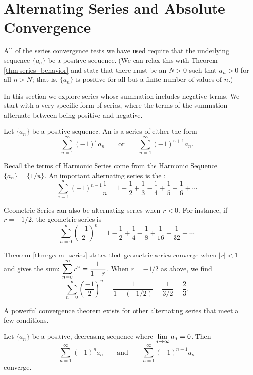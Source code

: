 \section{Alternating Series and Absolute Convergence}\label{sec:alt_series}

All of the series convergence tests we have used require that the underlying sequence $\{a_n\}$ be a positive sequence. (We can relax this with Theorem \ref{thm:series_behavior} and state that there must be an $N>0$ such that $a_n>0$ for all $n>N$; that is, $\{a_n\}$ is positive for all but a finite number of values of $n$.)

In this section we explore series whose summation includes negative terms. We start with a very specific form of series, where the terms of the summation alternate between being positive and negative.

{Let $\{a_n\}$ be a positive sequence. An  is a series of either the form
$$\sum_{n=1}^\infty (-1)^na_n\qquad \text{or}\qquad \sum_{n=1}^\infty (-1)^{n+1}a_n.$$
}

Recall the terms of Harmonic Series come from the Harmonic Sequence $\{a_n\} = \{1/n\}$. An important alternating series is the :
$$\sum_{n=1}^\infty (-1)^{n+1}\frac1n = 1-\frac12+\frac13-\frac14+\frac15-\frac16+\cdots$$

Geometric Series can also be alternating series when $r<0$. For instance, if $r=-1/2$, the geometric series is
$$\sum_{n=0}^\infty \left(\frac{-1}{2}\right)^n = 1-\frac12+\frac14-\frac18+\frac1{16}-\frac1{32}+\cdots$$ 

Theorem \ref{thm:geom_series} states that geometric series converge when $|r|<1$ and gives the sum: $\displaystyle \sum_{n=0}^\infty r^n = \frac1{1-r}$. When $r=-1/2$ as above, we find
$$\sum_{n=0}^\infty \left(\frac{-1}{2}\right)^n = \frac1{1-(-1/2)} = \frac 1{3/2} = \frac23.$$

A powerful convergence theorem exists for other alternating series that meet a few conditions.

{Let $\{a_n\}$ be a positive, decreasing sequence where $\displaystyle \lim_{n\to\infty}a_n=0$. Then
$$\sum_{n=1}^\infty (-1)^{n}a_n \qquad \text{and}\qquad \sum_{n=1}^\infty (-1)^{n+1}a_n$$ converge.
}

